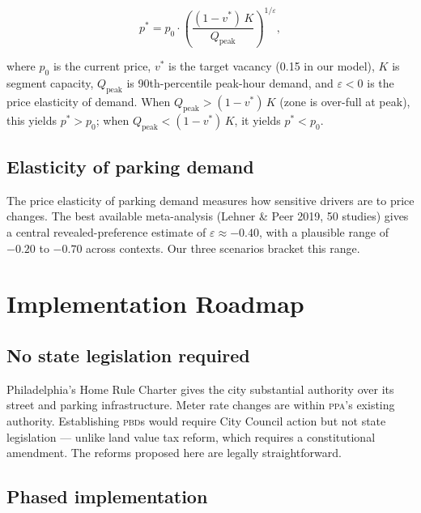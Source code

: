 \documentclass[11pt, letterpaper]{article}
\newcommand{\pbd}{\textsc{pbd}}
\newcommand{\ppa}{\textsc{ppa}}
\begin{document}
\begin{equation}
  p^* = p_0 \cdot
    \left(\frac{(1 - v^*)\,K}
               {Q_{\text{peak}}}\right)^{1/\varepsilon},
  \label{eq:arnott}
\end{equation}

where $p_0$ is the current price, $v^*$ is the target vacancy (0.15 in our
model), $K$ is segment capacity, $Q_{\text{peak}}$ is 90th-percentile
peak-hour demand, and $\varepsilon < 0$ is the price elasticity of demand.
When $Q_{\text{peak}} > (1-v^*)\,K$ (zone is over-full at peak), this yields
$p^* > p_0$; when $Q_{\text{peak}} < (1-v^*)\,K$, it yields $p^* < p_0$.

\subsection{Elasticity of parking demand}

The price elasticity of parking demand measures how sensitive drivers are to
price changes. The best available meta-analysis (Lehner \& Peer 2019,
50 studies) gives a central revealed-preference estimate of $\varepsilon
\approx -0.40$, with a plausible range of $-0.20$ to $-0.70$ across
contexts. Our three scenarios bracket this range.

\clearpage

\section{Implementation Roadmap}
\label{sec:implementation}

\subsection{No state legislation required}

Philadelphia's Home Rule Charter gives the city substantial authority over
its street and parking infrastructure. Meter rate changes are within \ppa{}'s
existing authority. Establishing \pbd{}s would require City Council action
but not state legislation --- unlike land value tax reform, which requires a
constitutional amendment. The reforms proposed here are legally straightforward.

\subsection{Phased implementation}
\end{document}
